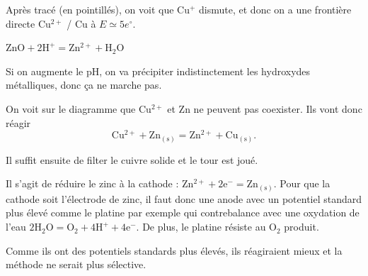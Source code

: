 \begin{solution}
\begin{questions}
\begin{parts}
    Après tracé (en pointillés), on voit que Cu$^+$ dismute, et donc on a une frontière directe Cu$^{2+}$ / Cu à $E \simeq 5 e^\circ$.
\end{parts}

    \question $\mathrm{ZnO + 2 H^+ = Zn^{2+} + H_2O}$
    
    \question Si on augmente le pH, on va précipiter indistinctement les hydroxydes métalliques, donc ça ne marche pas.
    
    \question On voit sur le diagramme que Cu$^{2+}$ et Zn ne peuvent pas coexister. Ils vont donc réagir $$\mathrm{Cu^{2+} + Zn_{(s)} = Zn^{2+} + Cu_{(s)}}.$$
    
    \question Il suffit ensuite de filter le cuivre solide et le tour est joué.
    
    \question Il s'agit de réduire le zinc à la cathode : $\mathrm{Zn^{2+} + 2 e^- = Zn_{(s)}}$. Pour que la cathode soit l'électrode de zinc, il faut donc une anode avec un potentiel standard plus élevé comme le platine par exemple qui contrebalance avec une oxydation de l'eau
    $\mathrm{2 H_2O = O_2 + 4 H^+ + 4 e^-}$. De plus, le platine résiste au O$_2$ produit.

    \question Comme ils ont des potentiels standards plus élevés, ils réagiraient mieux et la méthode ne serait plus sélective.

\end{questions}

    

\end{solution}

